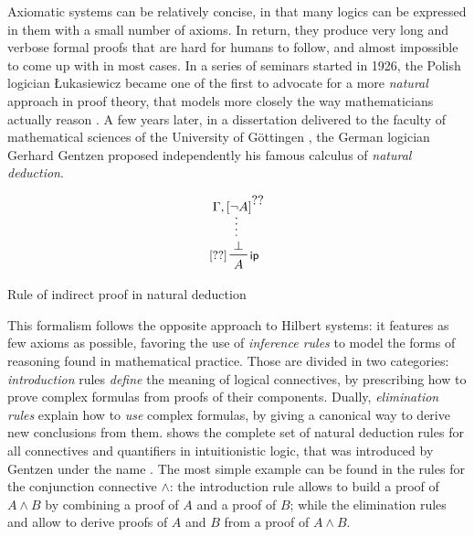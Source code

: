 Axiomatic systems can be relatively concise, in that many logics can be
expressed in them with a small number of axioms. In return, they produce very
long and verbose formal proofs that are hard for humans to follow, and almost
impossible to come up with in most cases. In a series of seminars started in
1926, the Polish logician Łukasiewicz became one of the first to advocate for a
more \emph{natural} approach in proof theory, that models more closely the way
mathematicians actually reason . A few years
later, in a dissertation delivered to the faculty of mathematical sciences of
the University of Göttingen , the German
logician Gerhard Gentzen proposed independently his famous calculus of
\emph{natural deduction}.

\begin{marginfigure}
  $$
  \prftree[r][l]{\rsf{ip}}{\small[\prfref<HA>]}
  {\summ
    {\Gamma, \prfboundedassumption<HA>{\neg A}}
    {\bot}}
  {A}    
  $$
  \caption{Rule of indirect proof in natural deduction}
\end{marginfigure}

This formalism follows the opposite approach to Hilbert systems: it features as
few axioms as possible, favoring the use of \emph{inference rules} to model the
forms of reasoning found in mathematical practice. Those are divided in two
categories: \emph{introduction} rules \emph{define} the meaning of logical
connectives, by prescribing how to prove complex formulas from proofs of their
components. Dually, \emph{elimination rules} explain how to \emph{use} complex
formulas, by giving a canonical way to derive new conclusions from them.
 shows the complete set of natural deduction rules for all
connectives and quantifiers in intuitionistic logic, that was introduced by
Gentzen under the name  \cite{gentzen_untersuchungen_1935}. The most simple example can be
found in the rules for the conjunction connective $\land$: the introduction rule
 allows to build a proof of $A \land B$ by combining a proof of $A$
and a proof of $B$; while the elimination rules  and  allow to derive proofs of $A$ and $B$ from a proof of $A \land B$.

